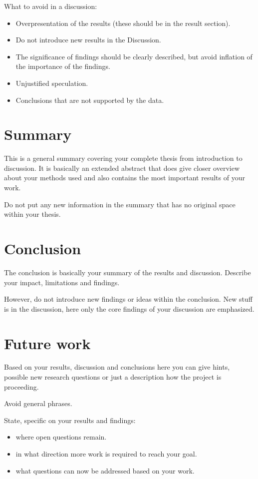 What to avoid in a discussion:
\begin{itemize}
	\item Overpresentation of the results (these should be in the result section).
	\item Do not introduce new results in the Discussion.
	\item The significance of findings should be clearly described, but avoid inflation of the importance of the findings.
	\item Unjustified speculation.
	\item Conclusions that are not supported by the data.
\end{itemize}

\section{Summary} \label{AboutSummary}

This is a general summary covering your complete thesis from introduction to discussion.
It is basically an extended abstract that does give closer overview about your methods used and also contains the most important results of your work.

Do not put any new information in the summary that has no original space within your thesis.

\section{Conclusion} \label{AboutConclusion}

The conclusion is basically your summary of the results and discussion.
Describe your impact, limitations and findings.

However, do not introduce new findings or ideas within the conclusion.
New stuff is in the discussion, here only the core findings of your discussion are emphasized.

\section{Future work} \label{AboutFuturework}

Based on your results, discussion and conclusions here you can give hints, possible new research questions or just a description how the project is proceeding.

Avoid general phrases.

State, specific on your results and findings:
\begin{itemize}
	\item where open questions remain.
	\item in what direction more work is required to reach your goal.
	\item what questions can now be addressed based on your work.
\end{itemize}
